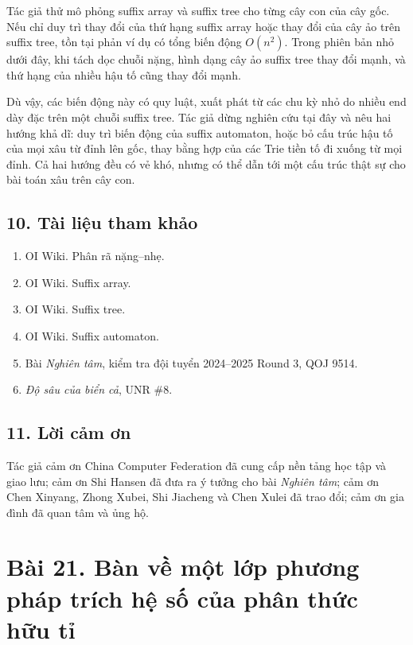\documentclass[11pt]{article}
\begin{document}
Tác giả thử mô phỏng suffix array và suffix tree cho từng cây con của cây gốc.
Nếu chỉ duy trì thay đổi của thứ hạng suffix array hoặc thay đổi của cây ảo
trên suffix tree, tồn tại phản ví dụ có tổng biến động \(O(n^2)\). Trong phiên
bản nhỏ dưới đây, khi tách dọc chuỗi nặng, hình dạng cây ảo suffix tree thay
đổi mạnh, và thứ hạng của nhiều hậu tố cũng thay đổi mạnh.

\begin{center}
\end{center}

Dù vậy, các biến động này có quy luật, xuất phát từ các chu kỳ nhỏ do nhiều
end dày đặc trên một chuỗi suffix tree. Tác giả dừng nghiên cứu tại đây và
nêu hai hướng khả dĩ: duy trì biến động của suffix automaton, hoặc bỏ cấu trúc
hậu tố của mọi xâu từ đỉnh lên gốc, thay bằng hợp của các Trie tiền tố đi
xuống từ mọi đỉnh. Cả hai hướng đều có vẻ khó, nhưng có thể dẫn tới một cấu
trúc thật sự cho bài toán xâu trên cây con.

\subsection*{10. Tài liệu tham khảo}

\begin{enumerate}
  \item OI Wiki. Phân rã nặng--nhẹ.
  \item OI Wiki. Suffix array.
  \item OI Wiki. Suffix tree.
  \item OI Wiki. Suffix automaton.
  \item Bài \emph{Nghiên tâm}, kiểm tra đội tuyển 2024--2025 Round 3, QOJ 9514.
  \item \emph{Độ sâu của biển cả}, UNR \#8.
\end{enumerate}

\subsection*{11. Lời cảm ơn}

Tác giả cảm ơn China Computer Federation đã cung cấp nền tảng học tập và giao
lưu; cảm ơn Shi Hansen đã đưa ra ý tưởng cho bài \emph{Nghiên tâm}; cảm ơn
Chen Xinyang, Zhong Xubei, Shi Jiacheng và Chen Xulei đã trao đổi; cảm ơn gia
đình đã quan tâm và ủng hộ.

\section*{Bài 21. Bàn về một lớp phương pháp trích hệ số của phân thức hữu tỉ}
\end{document}

